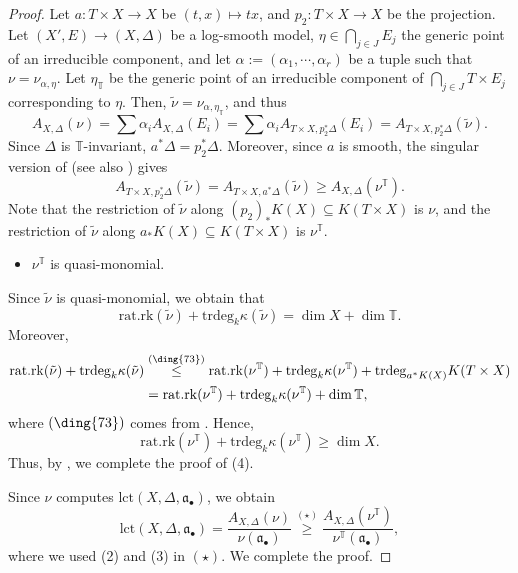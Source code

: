 \documentclass[a4paper,12pt]{amsart}
\theoremstyle{definition} %
\theoremstyle{remark}
\numberwithin{equation}{section}
\newcommand{\whitestar}{\mathrel{\text{\ding{73}}}}
\begin{document}
\begin{proof}
Let $a:T\times X\to X$ be $(t,x)\mapsto tx$, and $p_2:T\times X\to X$ be the projection. Let $(X',E)\to (X,\Delta)$ be a log-smooth model, $\eta\in \bigcap_{j\in J} E_j$ the generic point of an irreducible component, and let $\alpha:=(\alpha_1,\cdots,\alpha_r)$ be a tuple such that $\nu=\nu_{\alpha,\eta}$. Let $\eta_{\mathbb{T}}$ be the generic point of an irreducible component of $\bigcap_{j\in J}T\times E_j$ corresponding to $\eta$. Then, $\tilde{\nu}=\nu_{\alpha,\eta_{\mathbb{T}}}$, and thus
$$ A_{X,\Delta}(\nu)=\sum \alpha_iA_{X,\Delta}(E_i)=\sum \alpha_i A_{T\times X,p^*_2\Delta}(E_i)=A_{T\times X,p^*_2\Delta}(\tilde{\nu}).$$
Since $\Delta$ is $\mathbb{T}$-invariant, $a^*\Delta=p^*_2\Delta$. Moreover, since $a$ is smooth, the singular version of \cite[Proposition 5.13]{JM12} (see also \cite[Proof of Theorem 23]{Liu18}) gives
$$ A_{T\times X,p^*_2\Delta}(\tilde{\nu})=A_{T\times X,a^*\Delta}(\tilde{\nu})\ge A_{X,\Delta}(\nu^{\mathbb{T}}).$$
Note that the restriction of $\tilde{\nu}$ along $(p_2)_*K(X)\subseteq K(T\times X)$ is $\nu$, and the restriction of $\tilde{\nu}$ along $a_*K(X)\subseteq K(T\times X)$ is $\nu^{\mathbb{T}}$.

\begin{itemize}
\item[(4)] $\nu^{\mathbb{T}}$ is quasi-monomial.
\end{itemize}

Since $\tilde{\nu}$ is quasi-monomial, we obtain that
$$ \mathrm{rat.rk}(\tilde{\nu})+\mathrm{trdeg}_k\kappa(\tilde{\nu})=\dim X+\dim \mathbb{T}.$$
Moreover,
$$
\begin{aligned}\mathrm{rat.rk}(\tilde{\nu})+\mathrm{trdeg}_k\kappa(\tilde{\nu})&\overset{(\whitestar)}{\le} \mathrm{rat.rk}(\nu^{\mathbb{T}})+\mathrm{trdeg}_k\kappa(\nu^{\mathbb{T}})+\mathrm{trdeg}_{a^*K(X)}K(T\times X)
\\ & =\mathrm{rat.rk}(\nu^{\mathbb{T}})+\mathrm{trdeg}_k\kappa(\nu^{\mathbb{T}})+\dim \mathbb{T},
\end{aligned}
$$
where $(\whitestar)$ comes from \cite[Theorem 1.24]{Xu25}. Hence,
$$ \mathrm{rat.rk}(\nu^{\mathbb{T}})+\mathrm{trdeg}_k\kappa(\nu^{\mathbb{T}})\ge \dim X.$$
Thus, by \cite[Proposition 1.28]{Xu25}, we complete the proof of (4).

\smallskip

Since $\nu$ computes $\mathrm{lct}(X,\Delta,\mathfrak{a}_{\bullet})$, we obtain
$$ \mathrm{lct}(X,\Delta,\mathfrak{a}_{\bullet})=\frac{A_{X,\Delta}(\nu)}{\nu(\mathfrak{a}_{\bullet})}\overset{(\star)}{\ge} \frac{A_{X,\Delta}(\nu^{\mathbb{T}})}{\nu^{\mathbb{T}}(\mathfrak{a}_{\bullet})},$$
where we used (2) and (3) in $(\star)$. We complete the proof.
\end{proof}
\end{document}
